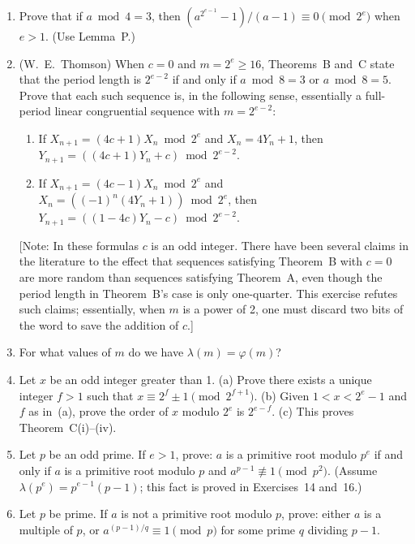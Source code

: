 \documentclass[12pt]{article}
\begin{document}
\begin{enumerate}
\item[\textbf{8.}] [$M20$] Prove that if $a \bmod 4 = 3$, then $(a^{2^{e-1}} - 1)/(a - 1) \equiv 0 \pmod{2^e}$ when $e > 1$. (Use Lemma~P.)

\item[\textbf{9.}] [$M22$] (W.~E.~Thomson) When $c = 0$ and $m = 2^e \geq 16$, Theorems~B and~C state that the period length is $2^{e-2}$ if and only if $a \bmod 8 = 3$ or $a \bmod 8 = 5$. Prove that each such sequence is, in the following sense, essentially a full-period linear congruential sequence with $m = 2^{e-2}$:

\begin{enumerate}
\item[a)] If $X_{n+1} = (4c+1)X_n \bmod 2^e$ and $X_n = 4Y_n + 1$, then $Y_{n+1} = ((4c+1)Y_n + c) \bmod 2^{e-2}$.
\item[b)] If $X_{n+1} = (4c-1)X_n \bmod 2^e$ and $X_n = ((-1)^n(4Y_n+1)) \bmod 2^e$, then $Y_{n+1} = ((1-4c)Y_n - c) \bmod 2^{e-2}$.
\end{enumerate}

[Note: In these formulas $c$ is an odd integer. There have been several claims in the literature to the effect that sequences satisfying Theorem~B with $c = 0$ are more random than sequences satisfying Theorem~A, even though the period length in Theorem~B's case is only one-quarter. This exercise refutes such claims; essentially, when $m$ is a power of 2, one must discard two bits of the word to save the addition of $c$.]

\item[\textbf{10.}] [$M21$] For what values of $m$ do we have $\lambda(m) = \varphi(m)$?

\item[\textbf{11.}] [$M28$] Let $x$ be an odd integer greater than 1. (a) Prove there exists a unique integer $f > 1$ such that $x \equiv 2^f \pm 1 \pmod{2^{f+1}}$. (b) Given $1 < x < 2^e - 1$ and $f$ as in~(a), prove the order of $x$ modulo $2^e$ is $2^{e-f}$. (c) This proves Theorem~C(i)--(iv).

\item[\textbf{12.}] [$M26$] Let $p$ be an odd prime. If $e > 1$, prove: $a$ is a primitive root modulo $p^e$ if and only if $a$ is a primitive root modulo $p$ and $a^{p-1} \not\equiv 1 \pmod{p^2}$. (Assume $\lambda(p^e) = p^{e-1}(p-1)$; this fact is proved in Exercises~14 and~16.)

\item[\textbf{13.}] [$M22$] Let $p$ be prime. If $a$ is not a primitive root modulo $p$, prove: either $a$ is a multiple of $p$, or $a^{(p-1)/q} \equiv 1 \pmod{p}$ for some prime $q$ dividing $p - 1$.


\end{enumerate}
\end{document}
